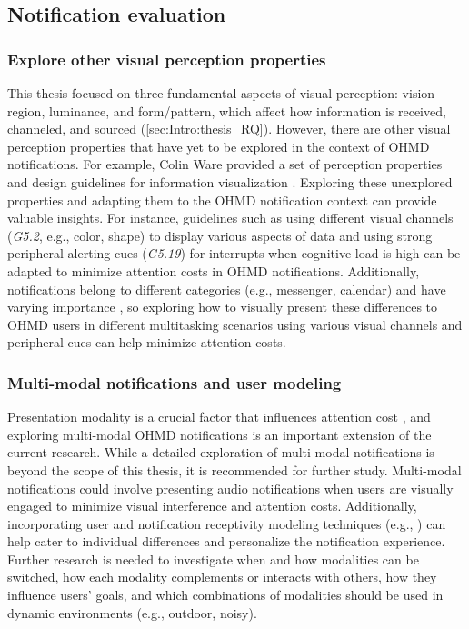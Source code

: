 \subsection{Notification evaluation}


\subsubsection*{Explore other visual perception properties}

This thesis focused on three fundamental aspects of visual perception: vision region, luminance, and form/pattern, which affect how information is received, channeled, and sourced (\autoref{sec:Intro:thesis_RQ}). However, there are other visual perception properties that have yet to be explored in the context of OHMD notifications. For example, Colin Ware provided a set of perception properties and design guidelines for information visualization \cite[Appendix D]{ware_information_2013}. Exploring these unexplored properties and adapting them to the OHMD notification context can provide valuable insights. For instance, guidelines such as using different visual channels (\textit{G5.2}, e.g., color, shape) to display various aspects of data and using strong peripheral alerting cues (\textit{G5.19}) for interrupts when cognitive load is high can be adapted to minimize attention costs in OHMD notifications. Additionally, notifications belong to different categories (e.g., messenger, calendar) and have varying importance \cite{sahami_shirazi_large_scale_2014}, so exploring how to visually present these differences to OHMD users in different multitasking scenarios using various visual channels and peripheral cues can help minimize attention costs.

\subsubsection*{Multi-modal notifications and user modeling}
\label{sec:Future_work:multimodal_notif}

Presentation modality is a crucial factor that influences attention cost \cite{mccrickard_model_2003}, and exploring multi-modal OHMD notifications is an important extension of the current research. While a detailed exploration of multi-modal notifications is beyond the scope of this thesis, it is recommended for further study. Multi-modal notifications could involve presenting audio notifications when users are visually engaged to minimize visual interference and attention costs. Additionally, incorporating user and notification receptivity modeling techniques (e.g., \cite{mehrotra_my_2016, lee_does_2019, yuan_how_2017, pielot_didnt_2014, visuri_understanding_2019}) can help cater to individual differences and personalize the notification experience. Further research is needed to investigate when and how modalities can be switched, how each modality complements or interacts with others, how they influence users' goals, and which combinations of modalities should be used in dynamic environments (e.g., outdoor, noisy).

